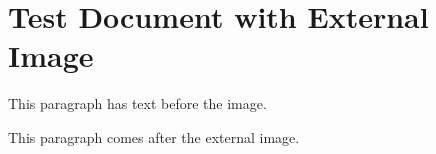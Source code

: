 \documentclass[11pt,a4paper]{article}
\begin{document}
\section{Test Document with External Image}

This paragraph has text before the image.

\begin{figure}[h]
\end{figure}

This paragraph comes after the external image.
\end{document}
